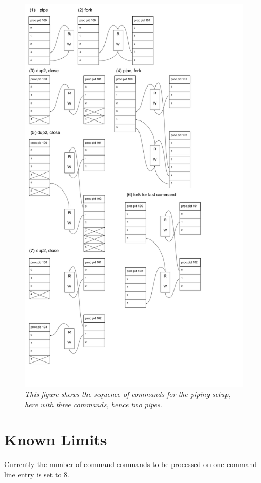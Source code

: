 \documentclass[a4paper,11pt,twoside]{article}
\begin{document}
\begin{figure}
\centering
\includegraphics[width=\textwidth]{pipes.png}
\caption{\textit{This figure shows the sequence of commands for the
    piping setup, here with three commands, hence two pipes.}}
\label{fig:pipes}
\end{figure}



\section{Known Limits}
Currently the number of command commands to be processed on one command line entry is set to 8. 
\end{document}
